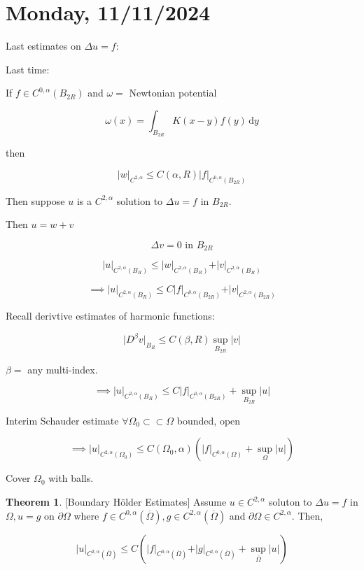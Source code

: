 \documentclass{article}
\theoremstyle{definition}
\newtheorem{theorem}{Theorem}
\begin{document}
\section*{Monday, 11/11/2024}

Last estimates on \(\Delta u = f\):

Last time:

If \(f \in C^{0, \alpha}(B_{2R})\) and \(\omega =\) Newtonian potential

\[
    \omega(x) = \int_{B_{2R}} K(x-y) f(y) \,\mathrm{d}y 
\]

then

\[
    \vert w \vert_{C^{2,\alpha}} \leq C(\alpha, R) \vert f \vert_{C^{0,\alpha}(B_{2R})}
\]

Then suppose \(u\) is a \(C^{2,\alpha}\) solution to \(\Delta u = f\) in \(B_{2R}\).

Then \(u = w + v\)

\[
    \Delta v = 0 \text{ in } B_{2R}
\]

\[
    \vert u \vert_{C^{2,\alpha}(B_{R})}\leq \vert w \vert_{C^{2,\alpha}(B_{R})} + \vert v \vert_{C^{2,\alpha}(B_R)}
\]

\[
    \implies \vert u \vert _{C^{2,\alpha}(B_R)} \leq C \vert f \vert _{C^{0,\alpha}(B_{2R})} + \vert v \vert _{C^{2,\alpha}(B_{2R})}
\]

Recall derivtive estimates of harmonic functions:

\[
    \vert D^\beta v \vert _{B_R} \leq C(\beta,R) \sup_{B_{2R}} \vert v \vert
\]

\(\beta =\) any multi-index.

\[
    \implies \vert u \vert_{C^{2,\alpha}(B_R)} \leq C \vert f \vert _{C^{0,\alpha}(B_{2R})} + \sup_{B_{2R}} \vert u \vert
\]

Interim Schauder estimate \(\forall \Omega_0 \subset \subset \Omega\) bounded, open

\[
    \implies \vert u \vert_{C^{2,\alpha}(\Omega_0)} \leq C(\Omega_0, \alpha) \left( \vert f \vert _{C^{0,\alpha}(\Omega)} + \sup_{\Omega} \vert u \vert  \right) 
\]

Cover \(\Omega_0\) with balls.


\begin{theorem}

    [Boundary H\"older Estimates] Assume \(u\in C^{2,\alpha}\) soluton to \(\Delta u = f\) in \(\Omega, u=g\) on \(\partial \Omega\) where \(f\in C^{0,\alpha}(\overline{\Omega}), g \in C^{2,\alpha}(\overline{\Omega})\) and \(\partial \Omega \in C^{2,\alpha}\). Then,

    \[
        \vert u \vert _{C^{2,\alpha}(\overline{\Omega})} \leq C \left( \vert f \vert _{C^{0,\alpha}(\overline{\Omega})} + \vert g \vert _{C^{2,\alpha}(\overline{\Omega} )} + \sup_{\overline{\Omega}} \vert u \vert \right) 
    \]

\end{theorem}
\end{document}
